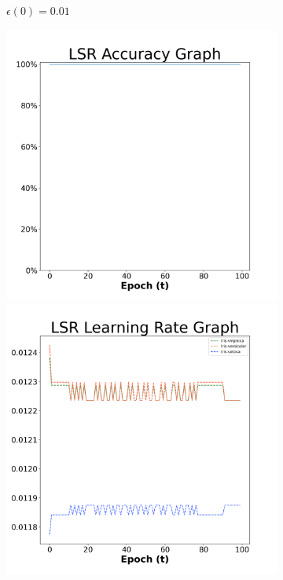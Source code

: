 \begin{figure}[H]
\begin{subfigure}{0.3\textwidth}
  \caption{$\epsilon(0)=0.01$}
\end{subfigure}\hfil %
\begin{subfigure}{0.3\textwidth}
  \includegraphics[width=\linewidth]{images/exper1/iris/LSR_0.03_acc.png}
  \includegraphics[width=\linewidth]{images/exper1/iris/LSR_0.03_lr.png}

\end{subfigure}
\end{figure}

